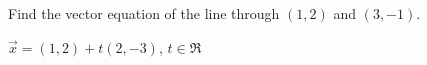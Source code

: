
\begin{Exercise}[
name={},
title={}, 
difficulty=0,
origin={\cite{SM}}]
Find the vector equation of the line through $(1,2)$ and $(3,-1)$.

\end{Exercise}

\begin{Answer}
$\vec{x} = (1,2)+t(2,-3)$, $t\in\Re$
\end{Answer}
